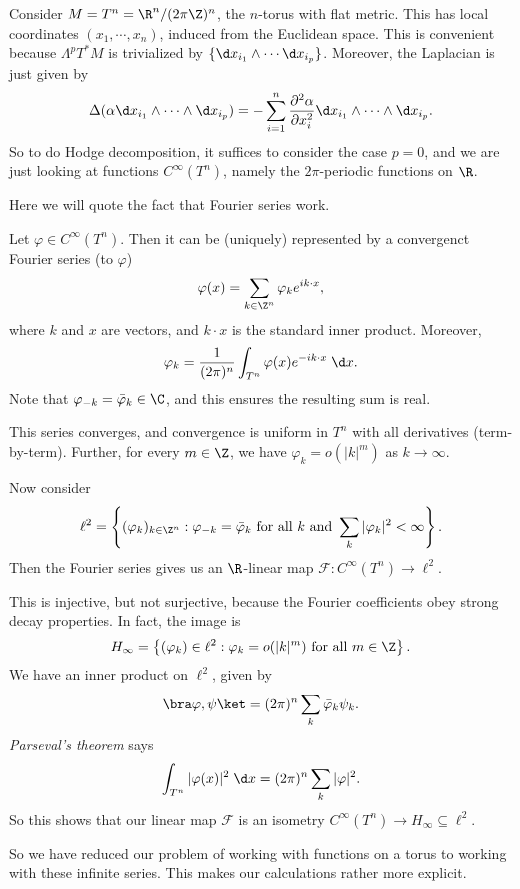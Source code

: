 \documentclass[a4paper]{article}
\begin{document}
\begin{eg}
  Consider $M = T^n = \R^n/(2\pi \Z)^n$, the $n$-torus with flat metric. This has local coordinates $(x_1, \cdots, x_n)$, induced from the Euclidean space. This is convenient because $\Lambda^p T^*M$ is trivialized by $\{\d x_{i_1} \wedge \cdots \d x_{i_p}\}$. Moreover, the Laplacian is just given by
  \[
    \Delta (\alpha \d x_{i_1} \wedge \cdots \wedge \d x_{i_p}) = -\sum_{i = 1}^n \frac{\partial^2 \alpha}{\partial x_i^2} \d x_{i_1} \wedge \cdots \wedge \d x_{i_p}.
  \]
  So to do Hodge decomposition, it suffices to consider the case $p = 0$, and we are just looking at functions $C^\infty(T^n)$, namely the $2\pi$-periodic functions on $\R$.

  Here we will quote the fact that Fourier series work.
  \begin{fact}
    Let $\varphi \in C^\infty (T^n)$. Then it can be (uniquely) represented by a convergenct Fourier series (to $\varphi$)
    \[
      \varphi(x) = \sum_{k \in \Z^n} \varphi_k e^{ik \cdot x},
    \]
    where $k$ and $x$ are vectors, and $k \cdot x$ is the standard inner product. Moreover,
    \[
      \varphi_k = \frac{1}{(2\pi)^n} \int_{T^n} \varphi(x) e^{-ik\cdot x}\;\d x.
    \]
    Note that $\varphi_{-k} = \bar{\varphi}_k \in \C$, and this ensures the resulting sum is real.

    This series converges, and convergence is uniform in $T^n$ with all derivatives (term-by-term). Further, for every $m \in \Z$, we have $\varphi_k = o(|k|^m)$ as $k \to \infty$.
  \end{fact}
  Now consider
  \[
    \ell^2 = \left\{(\varphi_k)_{k \in \Z^n}: \varphi_{-k} = \bar{\varphi}_k \text{ for all $k$ and }\sum_k |\varphi_k|^2 < \infty\right\}.
  \]
  Then the Fourier series gives us an $\R$-linear map $\mathcal{F}: C^\infty(T^n) \to \ell^2$.

  This is injective, but not surjective, because the Fourier coefficients obey strong decay properties. In fact, the image is
  \[
    H_\infty = \left\{(\varphi_k) \in \ell^2: \varphi_k = o(|k|^m) \text{ for all }m \in \Z\right\}.
  \]
  We have an inner product on $\ell^2$, given by
  \[
    \bra \varphi, \psi\ket = (2\pi)^n \sum_k \bar\varphi_k \psi_k.
  \]
  \emph{Parseval's theorem} says
  \[
    \int_{T^n} |\varphi(x)|^2 \;\d x = (2\pi)^n \sum_k |\varphi|^2.
  \]
  So this shows that our linear map $\mathcal{F}$ is an isometry $C^\infty(T^n) \to H_\infty \subseteq \ell^2$.

  So we have reduced our problem of working with functions on a torus to working with these infinite series. This makes our calculations rather more explicit.


\end{eg}
\end{document}

